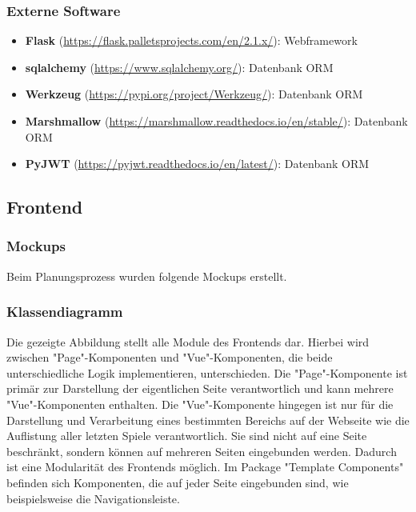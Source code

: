 \subsubsection{Externe Software}
\begin{itemize}
\item \textbf{Flask} (\href{https://flask.palletsprojects.com/en/2.1.x/}{https://flask.palletsprojects.com/en/2.1.x/}): Webframework
\item \textbf{sqlalchemy} (\href{https://www.sqlalchemy.org/}{https://www.sqlalchemy.org/}): Datenbank ORM
\item \textbf{Werkzeug} (\href{https://pypi.org/project/Werkzeug/}{https://pypi.org/project/Werkzeug/}): Datenbank ORM
\item \textbf{Marshmallow} (\href{https://marshmallow.readthedocs.io/en/stable/}{https://marshmallow.readthedocs.io/en/stable/}): Datenbank ORM
\item \textbf{PyJWT} (\href{https://pyjwt.readthedocs.io/en/latest/}{https://pyjwt.readthedocs.io/en/latest/}): Datenbank ORM
\end{itemize}

\newpage

\subsection{Frontend}

\subsubsection{Mockups}

Beim Planungsprozess wurden folgende Mockups erstellt.


\subsubsection{Klassendiagramm}


Die gezeigte Abbildung stellt alle Module des Frontends dar. Hierbei wird zwischen "Page"-Komponenten und "Vue"-Komponenten, die beide unterschiedliche Logik implementieren, unterschieden.
Die "Page"-Komponente ist primär zur Darstellung der eigentlichen Seite verantwortlich und kann mehrere "Vue"-Komponenten enthalten.
Die "Vue"-Komponente hingegen ist nur für die Darstellung und Verarbeitung eines bestimmten Bereichs auf der Webseite wie die Auflistung aller letzten Spiele verantwortlich.
Sie sind nicht auf eine Seite beschränkt, sondern können auf mehreren Seiten eingebunden werden. Dadurch ist eine Modularität des Frontends möglich.
Im Package "Template Components" befinden sich Komponenten, die auf jeder Seite eingebunden sind, wie beispielsweise die Navigationsleiste.

